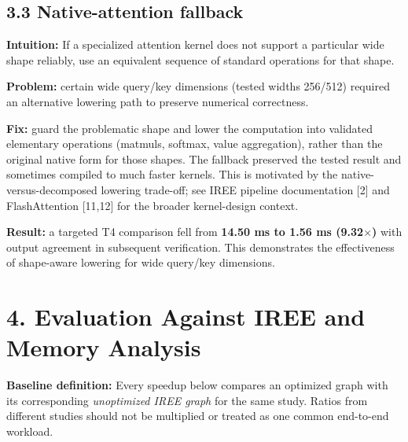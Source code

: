 \documentclass[10pt,a4paper]{article}
\begin{document}
\subsection*{3.3 Native-attention fallback}
\textbf{Intuition:} If a specialized attention kernel does not support a particular wide shape reliably, use an equivalent sequence of standard operations for that shape.\par\textbf{Problem:} certain wide query/key dimensions (tested widths 256/512) required an alternative lowering path to preserve numerical correctness.

\textbf{Fix:} guard the problematic shape and lower the computation into validated elementary operations (matmuls, softmax, value aggregation), rather than the original native form for those shapes. The fallback preserved the tested result and sometimes compiled to much faster kernels. This is motivated by the native-versus-decomposed lowering trade-off; see IREE pipeline documentation [2] and FlashAttention [11,12] for the broader kernel-design context.

\textbf{Result:} a targeted T4 comparison fell from \textbf{14.50 ms to 1.56 ms (9.32$\times$)} with output agreement in subsequent verification. This demonstrates the effectiveness of shape-aware lowering for wide query/key dimensions.
\vspace{-0.5cm}

\section*{4. Evaluation Against IREE and Memory Analysis}
\textbf{Baseline definition:} Every speedup below compares an optimized graph with its corresponding \emph{unoptimized IREE graph} for the same study. Ratios from different studies should not be multiplied or treated as one common end-to-end workload.
\end{document}
